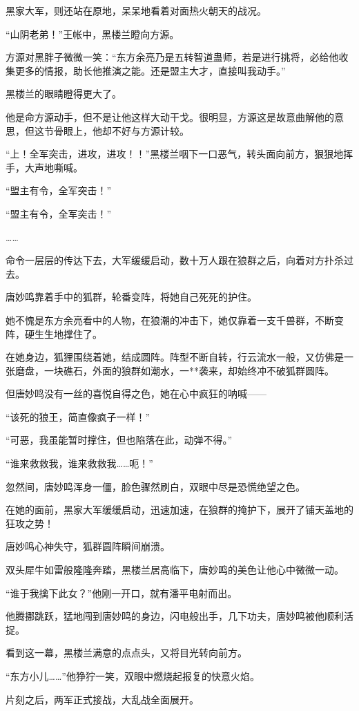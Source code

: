 \begin{this_body}
黑家大军，则还站在原地，呆呆地看着对面热火朝天的战况。

“山阴老弟！”王帐中，黑楼兰瞪向方源。

方源对黑胖子微微一笑：“东方余亮乃是五转智道蛊师，若是进行挑将，必给他收集更多的情报，助长他推演之能。还是盟主大才，直接叫我动手。”

黑楼兰的眼睛瞪得更大了。

他是命方源动手，但不是让他这样大动干戈。很明显，方源这是故意曲解他的意思，但这节骨眼上，他却不好与方源计较。

“上！全军突击，进攻，进攻！！”黑楼兰咽下一口恶气，转头面向前方，狠狠地挥手，大声地嘶喊。

“盟主有令，全军突击！”

“盟主有令，全军突击！”

……

命令一层层的传达下去，大军缓缓启动，数十万人跟在狼群之后，向着对方扑杀过去。

唐妙鸣靠着手中的狐群，轮番变阵，将她自己死死的护住。

她不愧是东方余亮看中的人物，在狼潮的冲击下，她仅靠着一支千兽群，不断变阵，硬生生地撑住了。

在她身边，狐狸围绕着她，结成圆阵。阵型不断自转，行云流水一般，又仿佛是一张磨盘，一块礁石，外面的狼群如潮水，一**袭来，却始终冲不破狐群圆阵。

但唐妙鸣没有一丝的喜悦自得之色，她在心中疯狂的呐喊——

“该死的狼王，简直像疯子一样！”

“可恶，我虽能暂时撑住，但也陷落在此，动弹不得。”

“谁来救救我，谁来救救我……呃！”

忽然间，唐妙鸣浑身一僵，脸色骤然刷白，双眼中尽是恐慌绝望之色。

在她的面前，黑家大军缓缓启动，迅速加速，在狼群的掩护下，展开了铺天盖地的狂攻之势！

唐妙鸣心神失守，狐群圆阵瞬间崩溃。

双头犀牛如雷般隆隆奔踏，黑楼兰居高临下，唐妙鸣的美色让他心中微微一动。

“谁于我擒下此女？”他刚一开口，就有潘平电射而出。

他腾挪跳跃，猛地闯到唐妙鸣的身边，闪电般出手，几下功夫，唐妙鸣被他顺利活捉。

看到这一幕，黑楼兰满意的点点头，又将目光转向前方。

“东方小儿……”他狰狞一笑，双眼中燃烧起报复的快意火焰。

片刻之后，两军正式接战，大乱战全面展开。


\end{this_body}
